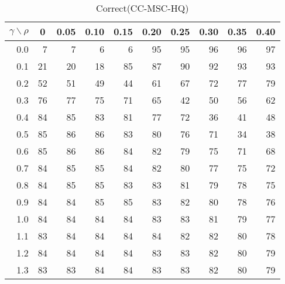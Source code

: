 \documentclass[12pt]{article}
\begin{document}
%
\begin{table}[!tbp]
\caption{Correct(CC-MSC-HQ)}
 \begin{center}
 \begin{tabular}{r|rrrrrrrrr}\hline\hline
\multicolumn{1}{c|}{$\gamma\backslash\rho$}&\multicolumn{1}{c}{0}&\multicolumn{1}{c}{0.05}&\multicolumn{1}{c}{0.10}&\multicolumn{1}{c}{0.15}&\multicolumn{1}{c}{0.20}&\multicolumn{1}{c}{0.25}&\multicolumn{1}{c}{0.30}&\multicolumn{1}{c}{0.35}&\multicolumn{1}{c}{0.40}\tabularnewline
\hline

0.0& 7& 7& 6& 6&95&95&96&96&97\tabularnewline
0.1&21&20&18&85&87&90&92&93&93\tabularnewline
0.2&52&51&49&44&61&67&72&77&79\tabularnewline
0.3&76&77&75&71&65&42&50&56&62\tabularnewline
0.4&84&85&83&81&77&72&36&41&48\tabularnewline
0.5&85&86&86&83&80&76&71&34&38\tabularnewline
0.6&85&86&86&84&82&79&75&71&68\tabularnewline
0.7&84&85&85&84&82&80&77&75&72\tabularnewline
0.8&84&85&85&83&83&81&79&78&75\tabularnewline
0.9&84&84&85&85&83&82&80&78&76\tabularnewline
1.0&84&84&84&84&83&83&81&79&77\tabularnewline
1.1&83&84&84&84&84&82&82&80&78\tabularnewline
1.2&84&84&84&84&83&83&82&80&79\tabularnewline
1.3&83&83&84&84&83&83&82&80&79\tabularnewline
\hline
\end{tabular}

\end{center}

\end{table}
\end{document}
